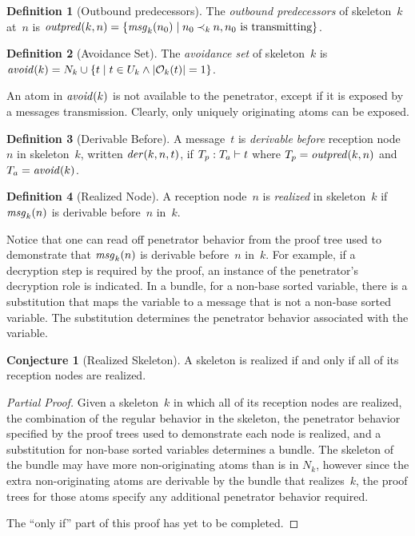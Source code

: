 \documentclass[12pt]{report}
\theoremstyle{definition}
\newtheorem{defn}{Definition}[chapter]
\newtheorem{conj}[thm]{Conjecture}
\newcommand{\outpred}{\fn{outpred}}
\newcommand{\avoid}{\fn{avoid}}
\newcommand{\msg}{\fn{msg}}
\begin{document}
\begin{defn}[Outbound predecessors]
The \emph{outbound predecessors} of
skeleton~$k$ at~$n$ is $\outpred(k,n)=\{\msg_k(n_0)\mid n_0 \kprec{k}
n, n_0\mbox{~is transmitting}\}$.
\end{defn}

\begin{defn}[Avoidance Set]\label{def:avoid}
The \emph{avoidance set} of skeleton~$k$ is
$\avoid(k)=N_k\cup\{t\mid t\in U_k\land|\orig_k(t)|=1\}$.
\end{defn}

An atom in $\avoid(k)$ is not available to the penetrator, except
if it is exposed by a messages transmission.  Clearly, only uniquely
originating atoms can be exposed.

\begin{defn}[Derivable Before]\label{def:der}
A message~$t$ is \emph{derivable before}
reception node~$n$ in skeleton~$k$, written $\fn{der}(k,n,t)$, if
$\der{t}{T_p}{T_a}$ where $T_p=\outpred(k,n)$ and $T_a=\avoid(k)$.
\end{defn}

\begin{defn}[Realized Node]
A reception node~$n$ is \emph{realized} in skeleton~$k$ if
$\msg_k(n)$ is derivable before~$n$ in~$k$.
\end{defn}

Notice that one can read off penetrator behavior from the proof tree
used to demonstrate that $\msg_k(n)$ is derivable before~$n$
in~$k$.  For example, if a decryption step is required by the proof,
an instance of the penetrator's decryption role is indicated.  In a
bundle, for a non-base sorted variable, there is a substitution that
maps the variable to a message that is not a non-base sorted variable.
The substitution determines the penetrator behavior associated with
the variable.

\begin{conj}[Realized Skeleton]
A skeleton is realized if and only if all of its reception nodes are
realized.
\end{conj}

\begin{proof}[Partial Proof]
Given a skeleton~$k$ in which all of its reception nodes are realized,
the combination of the regular behavior in the skeleton, the
penetrator behavior specified by the proof trees used to demonstrate
each node is realized, and a substitution for non-base sorted
variables determines a bundle.  The skeleton of the bundle may have
more non-originating atoms than is in $N_k$, however since the
extra non-originating atoms are derivable by the bundle that
realizes~$k$, the proof trees for those atoms specify any additional
penetrator behavior required.

The ``only if'' part of this proof has yet to be completed.
\end{proof}
\end{document}
